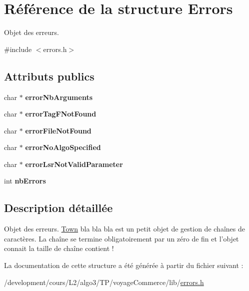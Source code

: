 \hypertarget{structErrors}{
\section{Référence de la structure Errors}
\label{structErrors}
}


Objet des erreurs.  




{\ttfamily \#include $<$errors.h$>$}

\subsection*{Attributs publics}
\begin{DoxyCompactItemize}
\item 
\hypertarget{structErrors_add18d77e05e1b61b88feeb2d5bdf5525}{
char $\ast$ {\bfseries errorNbArguments}}
\label{structErrors_add18d77e05e1b61b88feeb2d5bdf5525}

\item 
\hypertarget{structErrors_ae16317e85c4bbd2d2f8aa0412e87790f}{
char $\ast$ {\bfseries errorTagFNotFound}}
\label{structErrors_ae16317e85c4bbd2d2f8aa0412e87790f}

\item 
\hypertarget{structErrors_a7133eba5ff36c1f6d71a6cd2bcc0e8b1}{
char $\ast$ {\bfseries errorFileNotFound}}
\label{structErrors_a7133eba5ff36c1f6d71a6cd2bcc0e8b1}

\item 
\hypertarget{structErrors_a23cf6180d45a3075891ab189d0eb9023}{
char $\ast$ {\bfseries errorNoAlgoSpecified}}
\label{structErrors_a23cf6180d45a3075891ab189d0eb9023}

\item 
\hypertarget{structErrors_ae4ae272d96fc802c3bac03e1935fe063}{
char $\ast$ {\bfseries errorLsrNotValidParameter}}
\label{structErrors_ae4ae272d96fc802c3bac03e1935fe063}

\item 
\hypertarget{structErrors_aab575112743341bf554002622a903483}{
int {\bfseries nbErrors}}
\label{structErrors_aab575112743341bf554002622a903483}

\end{DoxyCompactItemize}


\subsection{Description détaillée}
Objet des erreurs. \hyperlink{structTown}{Town} bla bla bla est un petit objet de gestion de chaînes de caractères. La chaîne se termine obligatoirement par un zéro de fin et l'objet connait la taille de chaîne contient ! 

La documentation de cette structure a été générée à partir du fichier suivant :\begin{DoxyCompactItemize}
\item 
/development/cours/L2/algo3/TP/voyageCommerce/lib/\hyperlink{errors_8h}{errors.h}\end{DoxyCompactItemize}
